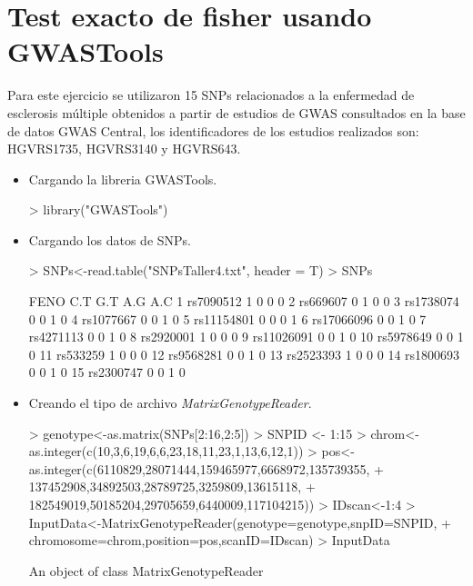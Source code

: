 \documentclass[12pt]{article}
\begin{document}
\section{Test exacto de fisher usando GWASTools}
Para este ejercicio se utilizaron 15 SNPs relacionados a la enfermedad de esclerosis múltiple obtenidos a partir de estudios de GWAS consultados en la base de datos GWAS Central, los identificadores de los estudios realizados son: HGVRS1735, HGVRS3140 y HGVRS643.
  \begin{itemize}
\item Cargando la libreria GWASTools.
\begin{Schunk}
\begin{Sinput}
> library("GWASTools")
\end{Sinput}
\end{Schunk}
\item Cargando los datos de SNPs.
\begin{Schunk}
\begin{Sinput}
> SNPs<-read.table("SNPsTaller4.txt", header = T)
> SNPs
\end{Sinput}
\begin{Soutput}
         FENO C.T G.T A.G A.C
1   rs7090512   1   0   0   0
2    rs669607   0   1   0   0
3   rs1738074   0   0   1   0
4   rs1077667   0   0   1   0
5  rs11154801   0   0   0   1
6  rs17066096   0   0   1   0
7   rs4271113   0   0   1   0
8   rs2920001   1   0   0   0
9  rs11026091   0   0   1   0
10  rs5978649   0   0   1   0
11   rs533259   1   0   0   0
12  rs9568281   0   0   1   0
13  rs2523393   1   0   0   0
14  rs1800693   0   0   1   0
15  rs2300747   0   0   1   0
\end{Soutput}
\end{Schunk}
\item Creando el tipo de archivo \textit{MatrixGenotypeReader}.
\begin{Schunk}
\begin{Sinput}
> genotype<-as.matrix(SNPs[2:16,2:5])
> SNPID <- 1:15
> chrom<-as.integer(c(10,3,6,19,6,6,23,18,11,23,1,13,6,12,1))
> pos<-as.integer(c(6110829,28071444,159465977,6668972,135739355,
+                   137452908,34892503,28789725,3259809,13615118,
+                   182549019,50185204,29705659,6440009,117104215))
> IDscan<-1:4
> InputData<-MatrixGenotypeReader(genotype=genotype,snpID=SNPID,
+                                 chromosome=chrom,position=pos,scanID=IDscan)
> InputData
\end{Sinput}
\begin{Soutput}
An object of class MatrixGenotypeReader 

\end{Soutput}
\end{Schunk}
\end{itemize}
\end{document}
